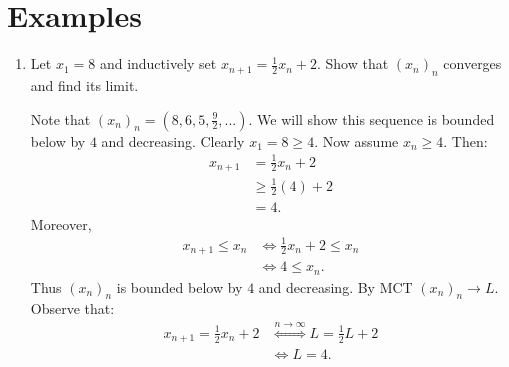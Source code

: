 \section*{Examples}
   \begin{enumerate}[label = (\arabic*)]
        \item Let $x_1 = 8$ and inductively set $x_{n+1} = \frac{1}{2}x_n + 2$. Show that $(x_n)_n$ converges and find its limit.
            {\color{red} \begin{solution}
                Note that $(x_n)_n = (8,6,5,\frac{9}{2},...)$. We will show this sequence is bounded below by $4$ and decreasing. Clearly $x_1 = 8 \geq 4$. Now assume $x_n \geq 4$. Then:
                    \begin{equation*}
                    \begin{split}
                        x_{n+1} &= \frac{1}{2}x_n + 2 \\
                        &\geq \frac{1}{2} (4) + 2 \\
                        & = 4.
                    \end{split}
                    \end{equation*}
                Moreover,
                    \begin{equation*}
                    \begin{split}
                        x_{n+1} \leq x_n 
                        & \iff \frac{1}{2}x_n + 2 \leq x_n \\
                        & \iff 4 \leq x_n.
                    \end{split}
                    \end{equation*}
                Thus $(x_n)_n$ is bounded below by $4$ and decreasing. By MCT $(x_n)_n \rightarrow L$. Observe that:
                    \begin{equation*}
                    \begin{split}
                        x_{n+1} = \frac{1}{2}x_n + 2
                        & \stackrel{n \rightarrow \infty}{\iff} L = \frac{1}{2}L + 2 \\
                        & \iff L = 4.
                    \end{split}
                    \end{equation*}
            \end{solution}}


\end{enumerate}
